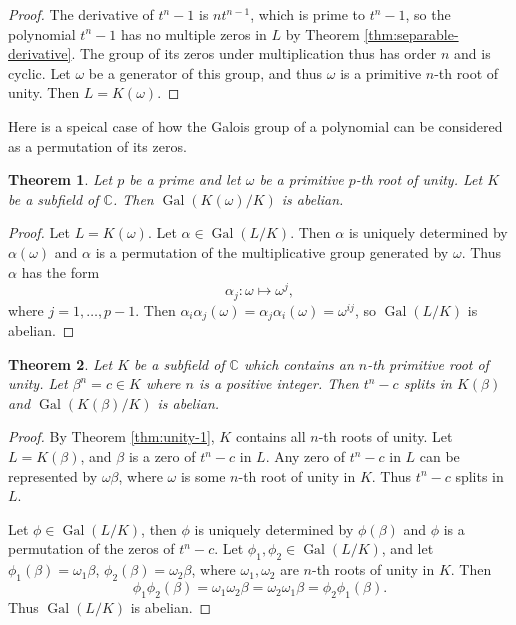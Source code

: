 \documentclass[12pt]{article}
\newtheorem{theorem}{Theorem}
\theoremstyle{definition}
\newcommand{\Gal}{\operatorname{Gal}}
\begin{document}
\begin{proof}
The derivative of $t^n-1$ is $n t^{n-1}$, which is prime to $t^n-1$, so the polynomial $t^n-1$ has no multiple zeros in $L$ by Theorem \ref{thm:separable-derivative}. The group of its zeros under multiplication thus has order $n$ and is cyclic. Let $\omega$ be a generator of this group, and thus $\omega$ is a primitive $n$-th root of unity. Then $L=K(\omega)$. 
\end{proof}

Here is a speical case of how the Galois group of a polynomial can be considered as a permutation of its zeros.


\begin{theorem} \label{thm:radical-1}
    Let $p$ be a prime and let $\omega$ be a primitive $p$-th root of unity. Let $K$ be a subfield of $\mathbb C$. Then $\Gal(K(\omega) / K)$ is abelian.
\end{theorem}
\begin{proof}
Let $L = K(\omega)$.  Let $\alpha \in \Gal(L / K)$. Then $\alpha$ is uniquely determined by $\alpha(\omega)$ and $\alpha$ is a permutation of the multiplicative group generated by $\omega$. Thus $\alpha$ has the form
$$
\alpha_j: \omega \mapsto \omega^j,
$$
where $j=1,\dots,p-1$. Then $\alpha_i \alpha_j (\omega) = \alpha_j \alpha_i (\omega) = \omega^{i j}$, so $ \Gal(L / K)$ is abelian.
\end{proof}

\begin{theorem} \label{thm:radical-2}
    Let $K$ be a subfield of $\mathbb{C}$ which contains an $n$-th primitive root of unity. Let $\beta^n = c \in K $ where $n$ is a positive integer. Then $t^n - c$ splits in $K(\beta)$ and $\Gal(K(\beta) / K)$ is abelian.
\end{theorem}

\begin{proof}
By Theorem \ref{thm:unity-1}, $K$ contains all $n$-th roots of unity. Let $L = K(\beta)$, and $\beta$ is a zero of $t^n-c$ in $L$. Any zero of $t^n-c$ in $L$ can be represented by $\omega \beta$, where $\omega$ is some $n$-th root of unity in $K$. Thus $t^n - c$ splits in $L$.  

Let $\phi \in \Gal(L / K)$, then $\phi$ is uniquely determined by $\phi(\beta)$ and $\phi$ is a permutation of the zeros of $t^n - c$. Let $\phi_1, \phi_2 \in \Gal(L / K)$, and let $\phi_1(\beta) = \omega_1\beta$, $\phi_2(\beta) = \omega_2\beta$, where $\omega_1, \omega_2$ are $n$-th roots of unity in $K$. Then
$$
\phi_1 \phi_2(\beta)=\omega_1 \omega_2 \beta=\omega_2 \omega_1  \beta=\phi_2 \phi_1(\beta).
$$
Thus $\Gal(L / K)$ is abelian.
\end{proof}
\end{document}
